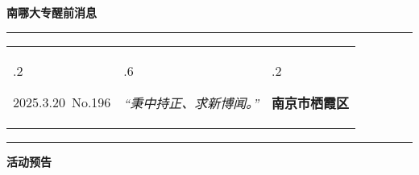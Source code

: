 \documentclass[letterpaper, 12pt]{article}
\begin{document}
\begin{center}
    \Huge\textbf{南哪大专醒前消息}
\end{center}
\vspace{4mm}
\hrule
\renewcommand\tabularxcolumn[1]{m{#1}}
\begin{tabularx}{\textwidth}{>{\hsize.2\hsize}X>{\hsize.6\hsize}X>{\hsize.2\hsize}X}
    \begin{flushleft}
        2025.3.20\, No.196
    \end{flushleft}
    &
    \begin{center}
        \textit{“秉中持正、求新博闻。”}
    \end{center}
    &
    \begin{flushright}
        \textbf{南京市栖霞区}
    \end{flushright}
\end{tabularx}
\vspace{-3.5mm}
\hrule
\vspace{4mm}
\centerline{\huge\textbf{活动预告}}
\end{document}
